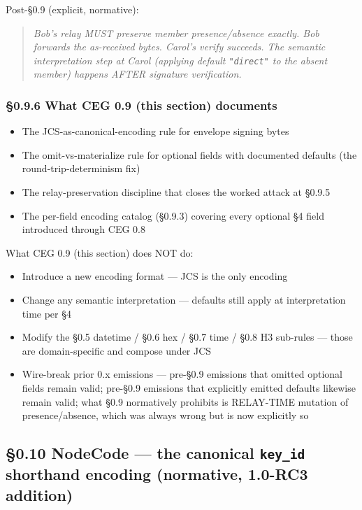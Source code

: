 \documentclass[11pt]{article}
\begin{document}
Post-§0.9 (explicit, normative):


\begin{quote}\itshape Bob's relay MUST preserve member presence/absence exactly. Bob forwards the as-received bytes. Carol's verify succeeds. The semantic interpretation step at Carol (applying default \texttt{"direct"} to the absent member) happens AFTER signature verification.\end{quote}


\subsubsection*{§0.9.6 What CEG 0.9 (this section) documents}


\begin{itemize}\setlength\itemsep{0pt}
\item The JCS-as-canonical-encoding rule for envelope signing bytes
\item The omit-vs-materialize rule for optional fields with documented defaults (the round-trip-determinism fix)
\item The relay-preservation discipline that closes the worked attack at §0.9.5
\item The per-field encoding catalog (§0.9.3) covering every optional §4 field introduced through CEG 0.8
\end{itemize}


What CEG 0.9 (this section) does NOT do:

\begin{itemize}\setlength\itemsep{0pt}
\item Introduce a new encoding format — JCS is the only encoding
\item Change any semantic interpretation — defaults still apply at interpretation time per §4
\item Modify the §0.5 datetime / §0.6 hex / §0.7 time / §0.8 H3 sub-rules — those are domain-specific and compose under JCS
\item Wire-break prior 0.x emissions — pre-§0.9 emissions that omitted optional fields remain valid; pre-§0.9 emissions that explicitly emitted defaults likewise remain valid; what §0.9 normatively prohibits is RELAY-TIME mutation of presence/absence, which was always wrong but is now explicitly so
\end{itemize}


\subsection*{§0.10 NodeCode — the canonical \texttt{key\_id} shorthand encoding (normative, 1.0-RC3 addition)}
\end{document}
